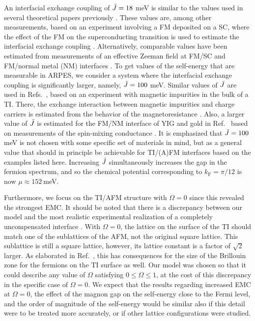 \documentclass[aps, prb, twocolumn,amsmath,amssymb,floatfix]{revtex4-2}
\begin{document}
An interfacial exchange coupling of $\Bar{J} = 18~$meV is similar to the values used in several theoretical papers previously \cite{EirikTIFMAFM, thingstad2021eliashberg, AFMNMAFMArnePRB, FMNMFMArnePRB}. These values are, among other measurements, based on an experiment involving a FM deposited on a SC, where the effect of the FM on the superconducting transition is used to estimate the interfacial exchange coupling \cite{ExpWeakJbar}. Alternatively, comparable values have been estimated from measurements of an effective Zeeman field at FM/SC and FM/normal metal (NM) interfaces \cite{FMNMFMArnePRB, ExpWeakJbarZeeman, ExpWeakJbarZeeman2}. To get values of the self-energy that are measurable in ARPES, we consider a system where the interfacial exchange coupling is significantly larger, namely, $\Bar{J} = 100~$meV. Similar values of $\Bar{J}$ are used in Refs.~\cite{magetizationdynamics, strongJbarPRL}, based on an experiment with magnetic impurities in the bulk of a TI. There, the exchange interaction between magnetic impurities and charge carriers is estimated from the behavior of the magnetoresistance \cite{ExpStrongJbar}. Also, a larger value of $\Bar{J}$ is estimated for the FM/NM interface of YIG and gold in Ref.~\cite{FMNMFMArnePRB} based on measurements of the spin-mixing conductance \cite{ExpStrongJbarYIG1, ExpStrongJbarYIG2, ExpFMYIG}. It is emphasized that $\Bar{J} = 100~$meV is not chosen with some specific set of materials in mind, but as a general value that should in principle be achievable for TI/(A)FM interfaces based on the examples listed here. Increasing $\Bar{J}$ simultaneously increases the gap in the fermion spectrum, and so the chemical potential corresponding to $k_{\textrm{F}} = \pi/12$ is now $\mu \approx 152~$meV.




Furthermore, we focus on the TI/AFM structure with $\Omega=0$ since this revealed the strongest EMC. It should be noted that there is a discrepancy between our model and the most realistic experimental realization of a completely uncompensated interface \cite{thingstad2021eliashberg}. With $\Omega = 0$, the lattice on the surface of the TI should match one of the sublattices of the AFM, not the original square lattice. This sublattice is still a square lattice, however, its lattice constant is a factor of $\sqrt{2}$ larger. As elaborated in Ref.~\cite{thingstad2021eliashberg}, this has consequences for the size of the Brillouin zone for the fermions on the TI surface as well. Our model was chosen so that it could describe any value of $\Omega$ satisfying $0\leq\Omega\leq1$, at the cost of this discrepancy in the specific case of $\Omega = 0$. We expect that the results regarding increased EMC at $\Omega = 0$, the effect of the magnon gap on the self-energy close to the Fermi level, and the order of magnitude of the self-energy would be similar also if this detail were to be treated more accurately, or if other lattice configurations were studied.
\end{document}
